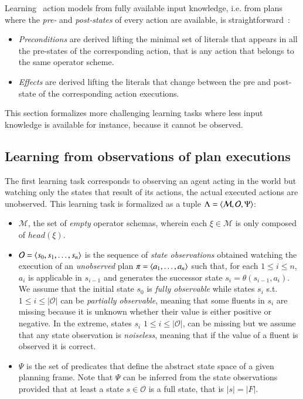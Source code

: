 Learning \strips\ action models from fully available input knowledge, i.e. from plans where the {\em pre-} and {\em post-states} of every action are available, is straightforward~\cite{jimenez2012review}:
\begin{itemize}
  \item {\em Preconditions} are derived lifting the minimal set of literals that appears in all the pre-states of the corresponding action, that is any action that belongs to the same operator scheme.
  \item {\em Effects} are derived lifting the literals that change between the pre and post-state of the corresponding action executions.
\end{itemize}
This section formalizes more challenging learning tasks where less input knowledge is available for instance, because it cannot be observed.


\subsection{Learning from observations of plan executions}
The first learning task corresponds to observing an agent acting in the world but watching only the states that result of its actions, the actual executed actions are unobserved. This learning task is formalized as a tuple $\Lambda={\langle \mathcal{M},\mathcal{O},\Psi \rangle}$:
\begin{itemize}
\item $\mathcal{M}$, the set of {\em empty} operator schemas, wherein each $\xi\in\mathcal{M}$ is only composed of $head(\xi)$.
\item $\mathcal{O}={\langle s_0,s_1,\ldots,s_{n} \rangle}$ is the sequence of {\em state observations} obtained watching the execution of an {\em unobserved} plan $\pi={\langle a_1, \ldots, a_n \rangle}$ such that, for each {\small $1\leq i\leq n$}, $a_i$ is applicable in $s_{i-1}$ and generates the successor state $s_i=\theta(s_{i-1},a_i)$. We assume that the initial state $s_0$ is {\em fully observable} while states $s_i$ s.t. {\small $1\leq i\leq |\mathcal{O}|$} can be {\em partially observable}, meaning that some fluents in $s_i$ are missing because it is unknown whether their value is either positive or negative. In the extreme, states $s_i$ {\small $1\leq i\leq |\mathcal{O}|$}, can be missing but we assume that any state observation is {\em noiseless}, meaning that if the value of a fluent is observed it is correct.
\item $\Psi$ is the set of predicates that define the abstract state space of a given planning frame. Note that $\Psi$ can be inferred from the state observations provided that at least a state $s\in \mathcal{O}$ is a full state, that is $|s|=|F|$.
\end{itemize}

